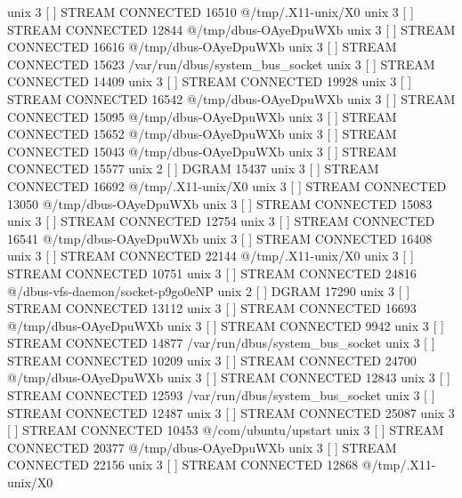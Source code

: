 unix  3      [ ]         STREAM     CONNECTED     16510    @/tmp/.X11-unix/X0
unix  3      [ ]         STREAM     CONNECTED     12844    @/tmp/dbus-OAyeDpuWXb
unix  3      [ ]         STREAM     CONNECTED     16616    @/tmp/dbus-OAyeDpuWXb
unix  3      [ ]         STREAM     CONNECTED     15623    /var/run/dbus/system_bus_socket
unix  3      [ ]         STREAM     CONNECTED     14409    
unix  3      [ ]         STREAM     CONNECTED     19928    
unix  3      [ ]         STREAM     CONNECTED     16542    @/tmp/dbus-OAyeDpuWXb
unix  3      [ ]         STREAM     CONNECTED     15095    @/tmp/dbus-OAyeDpuWXb
unix  3      [ ]         STREAM     CONNECTED     15652    @/tmp/dbus-OAyeDpuWXb
unix  3      [ ]         STREAM     CONNECTED     15043    @/tmp/dbus-OAyeDpuWXb
unix  3      [ ]         STREAM     CONNECTED     15577    
unix  2      [ ]         DGRAM                    15437    
unix  3      [ ]         STREAM     CONNECTED     16692    @/tmp/.X11-unix/X0
unix  3      [ ]         STREAM     CONNECTED     13050    @/tmp/dbus-OAyeDpuWXb
unix  3      [ ]         STREAM     CONNECTED     15083    
unix  3      [ ]         STREAM     CONNECTED     12754    
unix  3      [ ]         STREAM     CONNECTED     16541    @/tmp/dbus-OAyeDpuWXb
unix  3      [ ]         STREAM     CONNECTED     16408    
unix  3      [ ]         STREAM     CONNECTED     22144    @/tmp/.X11-unix/X0
unix  3      [ ]         STREAM     CONNECTED     10751    
unix  3      [ ]         STREAM     CONNECTED     24816    @/dbus-vfs-daemon/socket-p9go0eNP
unix  2      [ ]         DGRAM                    17290    
unix  3      [ ]         STREAM     CONNECTED     13112    
unix  3      [ ]         STREAM     CONNECTED     16693    @/tmp/dbus-OAyeDpuWXb
unix  3      [ ]         STREAM     CONNECTED     9942     
unix  3      [ ]         STREAM     CONNECTED     14877    /var/run/dbus/system_bus_socket
unix  3      [ ]         STREAM     CONNECTED     10209    
unix  3      [ ]         STREAM     CONNECTED     24700    @/tmp/dbus-OAyeDpuWXb
unix  3      [ ]         STREAM     CONNECTED     12843    
unix  3      [ ]         STREAM     CONNECTED     12593    /var/run/dbus/system_bus_socket
unix  3      [ ]         STREAM     CONNECTED     12487    
unix  3      [ ]         STREAM     CONNECTED     25087    
unix  3      [ ]         STREAM     CONNECTED     10453    @/com/ubuntu/upstart
unix  3      [ ]         STREAM     CONNECTED     20377    @/tmp/dbus-OAyeDpuWXb
unix  3      [ ]         STREAM     CONNECTED     22156    
unix  3      [ ]         STREAM     CONNECTED     12868    @/tmp/.X11-unix/X0
